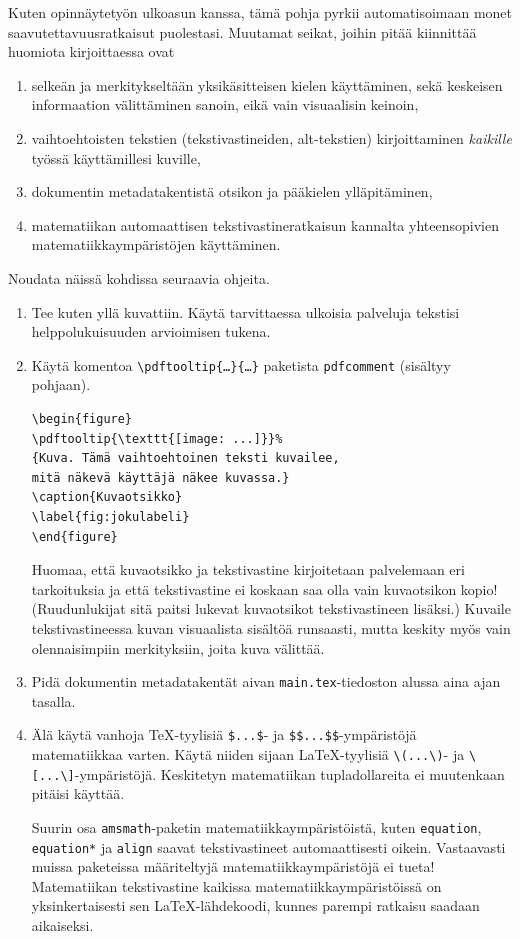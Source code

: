 Kuten opinnäytetyön ulkoasun kanssa, tämä pohja pyrkii automatisoimaan monet saavutettavuusratkaisut puolestasi. Muutamat seikat, joihin pitää kiinnittää huomiota kirjoittaessa ovat
\begin{enumerate}
\item selkeän ja merkitykseltään yksikäsitteisen kielen käyttäminen, sekä keskeisen informaation välittäminen sanoin, eikä vain visuaalisin keinoin,
\item vaihtoehtoisten tekstien (tekstivastineiden, alt-tekstien) kirjoittaminen \emph{kaikille} työssä käyttämillesi kuville,
\item dokumentin metadatakentistä otsikon ja pääkielen ylläpitäminen,
\item matematiikan automaattisen tekstivastineratkaisun kannalta yhteensopivien matematiikkaympäristöjen käyttäminen.
\end{enumerate}
Noudata näissä kohdissa seuraavia ohjeita.
\begin{enumerate}
\item Tee kuten yllä kuvattiin. Käytä tarvittaessa ulkoisia palveluja tekstisi helppolukuisuuden arvioimisen tukena.
\item Käytä komentoa \texttt{\textbackslash pdftooltip\{\ldots\}\{\ldots\}} paketista \texttt{pdfcomment} (sisältyy pohjaan).
\begin{verbatim}
\begin{figure}
\pdftooltip{\texttt{[image: ...]}}%
{Kuva. Tämä vaihtoehtoinen teksti kuvailee,
mitä näkevä käyttäjä näkee kuvassa.}
\caption{Kuvaotsikko}
\label{fig:jokulabeli}
\end{figure}
\end{verbatim}
Huomaa, että kuvaotsikko ja tekstivastine kirjoitetaan palvelemaan eri tarkoituksia ja että tekstivastine ei koskaan saa olla vain kuvaotsikon kopio! (Ruudunlukijat sitä paitsi lukevat kuvaotsikot tekstivastineen lisäksi.) Kuvaile tekstivastineessa kuvan visuaalista sisältöä runsaasti, mutta keskity myös vain olennaisimpiin merkityksiin, joita kuva välittää.
\item Pidä dokumentin metadatakentät aivan \texttt{main.tex}-tiedoston alussa aina ajan tasalla.
\item Älä käytä vanhoja \TeX{}-tyylisiä \verb+$...$+- ja \verb+$$...$$+-ympäristöjä matematiikkaa varten. Käytä niiden sijaan \LaTeX{}-tyylisiä \verb+\(...\)+- ja \verb+\[...\]+-ympäristöjä. Keskitetyn matematiikan tupladollareita ei muutenkaan pitäisi käyttää.

Suurin osa \texttt{amsmath}-paketin matematiikkaympäristöistä, kuten \texttt{equation}, \texttt{equation*} ja \texttt{align} saavat tekstivastineet automaattisesti oikein. Vastaavasti muissa paketeissa määriteltyjä matematiikkaympäristöjä ei tueta! Matematiikan tekstivastine kaikissa matematiikkaympäristöissä on yksinkertaisesti sen \LaTeX{}-lähdekoodi, kunnes parempi ratkaisu saadaan aikaiseksi.
\end{enumerate}
